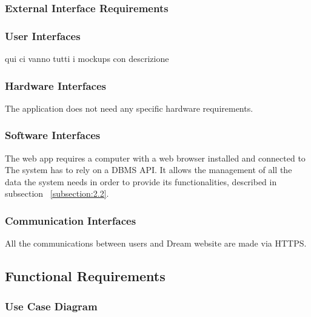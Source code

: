 \documentclass{article}
\begin{document}
\subsubsection{External Interface Requirements}

\subsubsection{User Interfaces}
qui ci vanno tutti i mockups con descrizione

\subsubsection{Hardware Interfaces}
The application does not need any specific hardware requirements. 

\subsubsection{Software Interfaces}
The web app requires a computer with a web browser installed and connected to 
The system has to rely on a DBMS API. It allows the management of all the data the system 
needs in order to provide its functionalities, described in subsection ~\ref{subsection:2.2}.

\subsubsection{Communication Interfaces}
All the communications between users and Dream website are made via HTTPS.

\subsection{Functional Requirements}
\subsubsection{Use Case Diagram}
\end{document}
